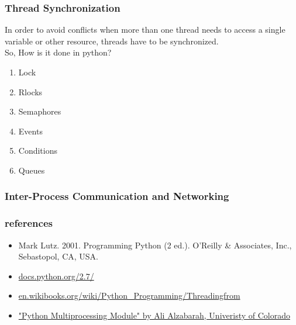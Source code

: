\documentclass{beamer}
\begin{document}
\begin{frame}[fragile]
\frametitle{Thread Synchronization}

In order to avoid conflicts when more than one thread needs to access a single variable or other resource, threads have to be synchronized. \\
 
So, How is it done in python? \\
\begin{enumerate}
 \item Lock
 \item Rlocks
 \item Semaphores
 \item Events
 \item Conditions
 \item Queues
\end{enumerate}
\end{frame}


\begin{frame}[fragile]
\frametitle{Inter-Process Communication and Networking}

\end{frame}

\begin{frame}
 \frametitle{references}
 \begin{itemize}
  \item Mark Lutz. 2001. Programming Python (2 ed.). O'Reilly \& Associates, Inc., Sebastopol, CA, USA.
  \item \href{https://docs.python.org/2.7/}{docs.python.org/2.7/}
  \item \href{http://en.wikibooks.org/wiki/Python_Programming/Threadingfrom}{en.wikibooks.org/wiki/Python\_Programming/Threadingfrom}
  \item \href{http://www.cs.colorado.edu/~kena/classes/5828/s10/presentations/ali_alzabarah_se_presentati.pdf}{"Python Multiprocessing
Module" by Ali Alzabarah, Univeristy of Colorado}
 \end{itemize}
\end{frame}
	







%
\end{document}
